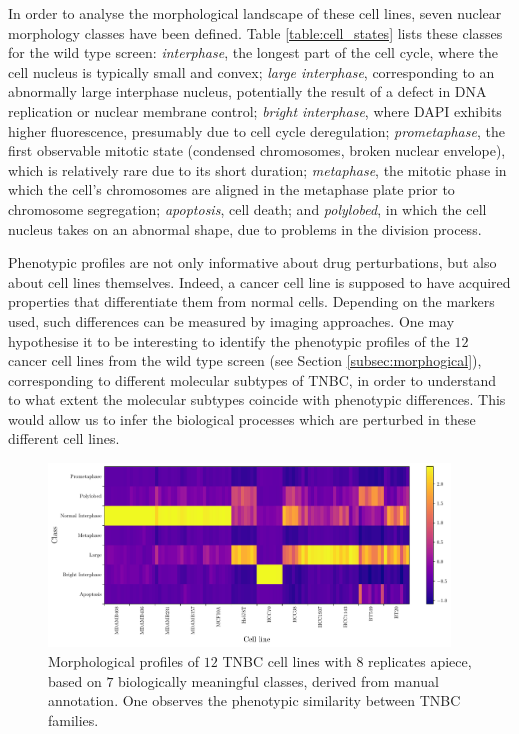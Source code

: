 In order to analyse the morphological landscape of these cell lines, seven nuclear morphology classes have been defined. Table \ref{table:cell_states} lists these classes for the wild type screen: \emph{interphase}, the longest part of the cell cycle, where the cell nucleus is typically small and convex; \emph{large interphase}, corresponding to an abnormally large interphase nucleus, potentially the result of a defect in DNA replication or nuclear membrane control; \emph{bright interphase}, where DAPI exhibits higher fluorescence, presumably due to cell cycle deregulation; \emph{prometaphase}, the first observable mitotic state (condensed chromosomes, broken nuclear envelope), which is relatively rare due to its short duration; \emph{metaphase}, the mitotic phase in which the cell's chromosomes are aligned in the metaphase plate prior to chromosome segregation; \emph{apoptosis}, cell death; and \emph{polylobed}, in which the cell nucleus takes on an abnormal shape, due to problems in the division process.

Phenotypic profiles are not only informative about drug perturbations, but also about cell lines themselves. Indeed, a cancer cell line is supposed to have acquired properties that differentiate them from normal cells. Depending on the markers used, such differences can be measured by imaging approaches. One may hypothesise it to be interesting to identify the phenotypic profiles of the $12$ cancer cell lines from the wild type screen (see Section \ref{subsec:morphogical}), corresponding to different molecular subtypes of TNBC, in order to understand to what extent the molecular subtypes coincide with phenotypic differences. This would allow us to infer the biological processes which are perturbed in these different cell lines.

\begin{figure}[h!]
\centering
\includegraphics[width=0.95\textwidth]{img/profile.pdf}
\caption{Morphological profiles of $12$ TNBC cell lines with $8$ replicates apiece, based on $7$ biologically meaningful classes, derived from manual annotation. One observes the phenotypic similarity between TNBC families.}
\label{fig:morphological_profiles}
\end{figure}

